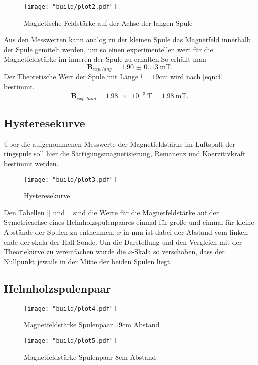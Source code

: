 \begin{figure}
    \caption{Magnetische Feldstärke auf der Achse der langen Spule}
    \label{fig:1}
    \centering
    \texttt{[image: "build/plot2.pdf"]}
\end{figure}
Aus den Messwerten kann analog zu der kleinen  Spule das Magnetfeld innerhalb der Spule 
gemitelt werden, um so einen experimentellen wert für die Magnetfeldstärke im inneren 
der Spule zu erhalten.So erhällt man
\begin{equation*}
    \symbf{B}_{exp,lang} = \qty{1.90(0.13)}{\milli\tesla}.
\end{equation*}
Der Theoretische Wert der Spule mit Länge $l = 19\unit{\centi\meter} $ wird nach 
\autoref{eqn:4} bestimmt.
\begin{equation*}
    \symbf{B}_{exp,lang} = \qty{1.98e-3}{\tesla} = \qty{1.98}{\milli\tesla}.
\end{equation*}

\subsection{Hysteresekurve}
Über die aufgenommenen Messwerte der Magnetfeldstärke im Luftspalt der ringspule soll hier 
die Sättigungsmagnetisierung, Remanenz und Koerzitivkraft bestimmt werden.
\begin{figure}[H]
    \caption{Hysteresekurve}
    \label{fig:3}
    \centering
    \texttt{[image: "build/plot3.pdf"]}
\end{figure}





Den Tabellen \autoref{} und \autoref{} sind die Werte für die Magnetfeldstärke auf der 
Symetrieachse eines Helmholzspulenpaares einmal für große und einmal für kleine 
Abstände der Spulen zu entnehmen. $x$ in $\unit{\milli\meter} $ ist dabei der Abstand 
vom linken ende der skala der Hall Sonde. Um die Darstellung und den Vergleich mit der 
Theoriekurve zu vereinfachen wurde die $x$-Skala so verschoben, dass der Nullpunkt jewails 
in der Mitte der beiden Spulen liegt.
\subsection{Helmholzspulenpaar}
\begin{figure}
    \caption{Magnetfeldstärke Spulenpaar $19\unit{\centi\meter}$ Abstand}
    \label{fig:4}
    \centering
    \texttt{[image: "build/plot4.pdf"]}
\end{figure}

\begin{figure}
    \caption{Magnetfeldstärke Spulenpaar $8\unit{\centi\meter}$ Abstand}
    \label{fig:5}
    \centering
    \texttt{[image: "build/plot5.pdf"]}
\end{figure}